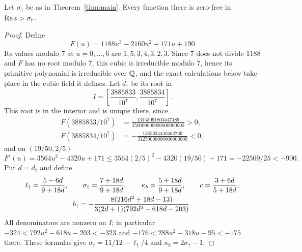 \begin{theorem}\label{thm:cubic}
Let $\sigma_\dagger$ be as in Theorem~\ref{thm:main}. Every function there is zero-free in $\operatorname{Re} s>\sigma_\dagger$.
\end{theorem}
\begin{proof}
Define
\begin{equation}\label{eq:F}
 F(u)=1188u^3-2160u^2+171u+190
\end{equation}
Its values modulo $7$ at $u=0,\ldots,6$ are $1,5,3,4,3,2,3$. Since $7$ does not divide $1188$ and $F$ has no root modulo $7$, this cubic is irreducible modulo $7$, hence its primitive polynomial is irreducible over $\mathbb Q$, and the exact calculations below take place in the cubic field it defines.
Let $d_\dagger$ be its root in
\begin{equation}\label{eq:cubicisolation}
 I=\left[\frac{3885833}{10^7},\frac{3885834}{10^7}\right].
\end{equation}
This root is in the interior and is unique there, since
\begin{align*}
 F(3885833/10^7)&=\frac{13153091803447489}{250000000000000000000}>0,\\
 F(3885834/10^7)&=-\frac{1385634440463739}{31250000000000000000}<0,
\end{align*}
and on $(19/50,2/5)$
\[
 F'(u)=3564u^2-4320u+171
 \le3564(2/5)^2-4320(19/50)+171=-22509/25<-900.
\]
Put $d=d_\dagger$ and define
\begin{gather}\label{eq:cubicparameters}
 \ell_\dagger=\frac{5-6d}{9+18d},\qquad
 \sigma_\dagger=\frac{7+18d}{9+18d},\qquad
 \kappa_b=\frac{5+18d}{9+18d},\qquad
 c=\frac{3+6d}{5+18d},\\
 b_\dagger=-\frac{8(216d^2+18d-13)}
                  {3(2d+1)(792d^2-618d-203)}.\notag
\end{gather}
All denominators are nonzero on $I$; in particular
$-324<792u^2-618u-203<-323$ and
$-176<288u^2-318u-95<-175$ there.
These formulas give $\sigma_\dagger=11/12-\ell_\dagger/4$ and $\kappa_b=2\sigma_\dagger-1$.


\end{proof}
